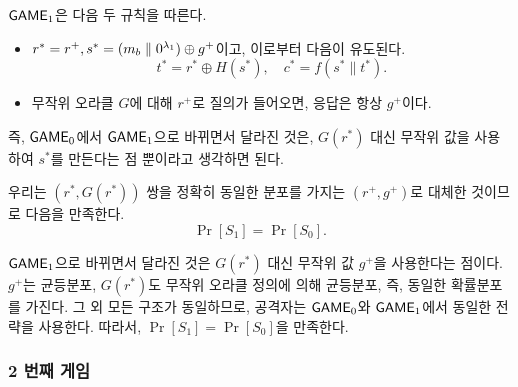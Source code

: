 $\textsf{GAME}_1$은 다음 두 규칙을 따른다.
\begin{itemize}
	\item $r^* = r^+, s^* = (m_b \parallel 0^{\lambda_1}) \oplus g^+$이고, 이로부터
	다음이 유도된다.
	$$
		t^* = r^* \oplus H(s^*), \quad
		c^* = f(s^* \parallel t^*).
	$$
	\item 무작위 오라클 $G$에 대해 $r^+$로 질의가 들어오면, 응답은 항상 $g^+$이다.
\end{itemize}

\begin{memo}
	즉, $\textsf{GAME}_0$에서 $\textsf{GAME}_1$으로 바뀌면서 달라진 것은, $G(r^*)$ 대신 무작위
	값을 사용하여 $s^*$를 만든다는 점 뿐이라고 생각하면 된다.
\end{memo}

우리는 $(r^*, G(r^*))$ 쌍을 정확히 동일한 분포를 가지는 $(r^+, g^+)$로 대체한
것이므로 다음을 만족한다.
$$
	\Pr[S_1] = \Pr[S_0].
$$

\begin{memo}
	$\textsf{GAME}_1$으로 바뀌면서 달라진 것은 $G(r^*)$ 대신 무작위 값 $g^+$을
	사용한다는 점이다. $g^+$는 균등분포, $G(r^*)$도 무작위 오라클 정의에 의해
	균등분포, 즉, 동일한 확률분포를 가진다. 그 외 모든 구조가 동일하므로,
	공격자는 $\textsf{GAME}_0$와 $\textsf{GAME}_1$에서 동일한 전략을 사용한다. 따라서, $\Pr[S_1]
	= \Pr[S_0]$을 만족한다.
\end{memo}

\newpage
\subsubsection{2 번째 게임}

